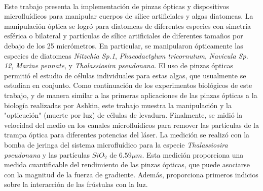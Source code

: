 \documentclass[letterpaper,12pt,oneside]{book}
\begin{document}
\\ \noindent Este trabajo presenta la implementación de pinzas ópticas y dispositivos microfluídicos para manipular cuerpos de sílice artificiales y algas diatomeas. La manipulación óptica se logró para diatomeas de diferentes especies con simetría esférica o bilateral y partículas de sílice artificiales de diferentes tamaños por debajo de los 25 micrómetros. En particular, se manipularon ópticamente las especies de diatomeas \textit{Nitzchia Sp.1}, \textit{Phaeodactylum tricornutum}, \textit{Navicula Sp. 12}, \textit{Marine pennate}, y \textit{Thalassiosira pseudonana}. El uso de pinzas ópticas permitió el estudio de células individuales para estas algas, que usualmente se estudian en conjunto. Como continuación de los experimentos biológicos de este trabajo, y de manera similar a las primeras aplicaciones de las pinzas ópticas a la biología realizadas por Ashkin, este trabajo muestra la manipulación y la "opticución" (muerte por luz) de células de levadura. Finalmente, se midió la velocidad del medio en los canales microfluidicos para remover las partículas de la trampa óptica para diferentes potencias del láser. La medición se realizó con la bomba de jeringa del sistema microfluídico para la especie \textit{Thalassiosira pseudonana} y las partículas $SiO_2$ de $6.59 \mu m$. Esta medición proporciona una medida cuantificable del rendimiento de las pinzas ópticas, que puede asociarse con la magnitud de la fuerza de gradiente. Además, proporciona primeros indicios sobre la interacción de las frústulas con la luz.
\end{document}
